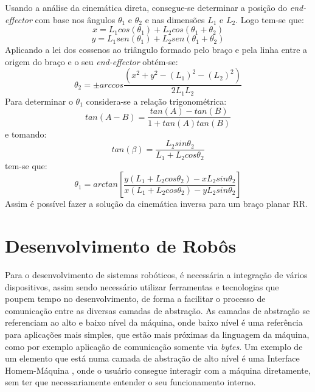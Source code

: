 Usando a análise da cinemática direta, consegue-se determinar a posição do \textit{end-effector} com base nos ângulos $\theta_{1}$ e $\theta_{2}$ e nas dimensões $L_{1}$ e $L_{2}$. Logo tem-se que:
\begin{equation}
x=L_1cos{(\theta_1)}+L_2cos{(\theta_1 + \theta_2)}
\end{equation}
\begin{equation}
y=L_{1}sen{(\theta_1)}+L_{2}sen{(\theta_1 + \theta_2)}
\end{equation}
Aplicando a lei dos cossenos ao triângulo formado pelo braço e pela linha entre a origem do braço e o seu \textit{end-effector} obtém-se: 
\begin{equation}
\theta_2=\pm arccos{\frac{(x^2+y^2-(L_1)^2-(L_2)^2)}{2L_1L_2}}
\end{equation}
Para determinar o $\theta_{1}$ considera-se a relação trigonométrica:
\begin{equation}
tan{(A - B)}=\frac{tan(A)-tan(B)}{1+tan(A) tan(B)}
\end{equation}
e tomando:
\begin{equation}
tan(\beta)=\frac{L_2 sin\theta_2}{L_1 + L_2 cos\theta_2}
\end{equation}
tem-se que:
\begin{equation}
\theta_1 = arctan[\frac{y(L_1 + L_2 cos\theta_2)-xL_2 sin\theta_2}{x(L_1 + L_2 cos\theta_2)-yL_2 sin\theta_2}]
\end{equation}
Assim é possível fazer a solução da cinemática inversa para um braço planar RR.

\section{Desenvolvimento de Robôs}\label{sec:desen_robo}
Para o desenvolvimento de sistemas robóticos, é necessária a integração de vários dispositivos, assim sendo necessário utilizar ferramentas e tecnologias que poupem tempo no desenvolvimento, de forma a facilitar o processo de comunicação entre as diversas camadas de abstração. 
As camadas de abstração se referenciam ao alto e baixo nível da máquina, onde baixo nível é uma referência para aplicações mais simples, que estão mais próximas da linguagem da máquina, como por exemplo aplicação de comunicação somente via \textit{bytes}. Um exemplo de um elemento que está numa camada de abstração de alto nível é uma Interface Homem-Máquina , onde o usuário consegue interagir com a máquina diretamente, sem ter que necessariamente entender o seu funcionamento interno.

